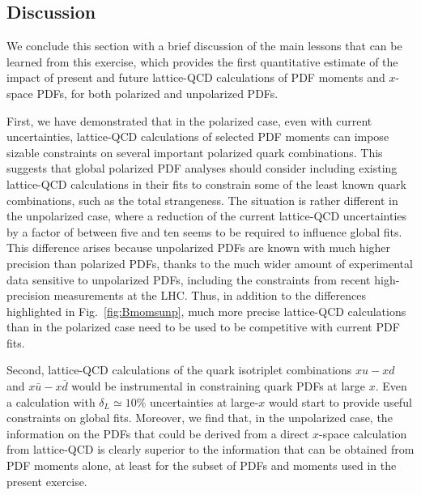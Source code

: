 \subsection{Discussion}

We conclude this section with a brief discussion of the main lessons that
can be learned from this exercise, which provides the first quantitative 
estimate of the impact of present and future lattice-QCD calculations of PDF 
moments and $x$-space PDFs, for both polarized and unpolarized PDFs.

First, we have demonstrated that in the polarized case,
even with current uncertainties, lattice-QCD calculations of
selected PDF moments can impose sizable constraints on several
important polarized quark combinations.
%
This suggests that global polarized PDF analyses should consider
including existing lattice-QCD calculations in their fits to constrain some
of the least known quark combinations, such as the total strangeness.
%
The situation is rather different in the unpolarized case,
where a reduction of the current lattice-QCD uncertainties by a factor of 
between five and ten seems to be required to influence global fits.
%
This difference arises because unpolarized PDFs are known with much higher 
precision than polarized PDFs, thanks to the much wider amount of experimental 
data sensitive to unpolarized PDFs,
including the constraints from recent high-precision measurements at the LHC.
%
Thus, in addition to the differences highlighted  in Fig.~\ref{fig:Bmomsunp},
much more precise lattice-QCD calculations than in the polarized case 
need to be used to be competitive with current PDF fits.


Second, lattice-QCD calculations of the quark isotriplet combinations
$xu-xd$ and $x\bar{u}-x\bar{d}$ would be instrumental in constraining
quark PDFs at large $x$.
%
Even a calculation with $\delta_L\simeq 10\%$ uncertainties at large-$x$ would
start to provide useful constraints on global fits.
%
Moreover, we find that, in the unpolarized case, the information on the
PDFs that could be derived from a direct $x$-space calculation
from lattice-QCD is clearly superior to the information that can be obtained
from PDF moments alone, at least for the subset of PDFs and moments used in 
the present exercise.

